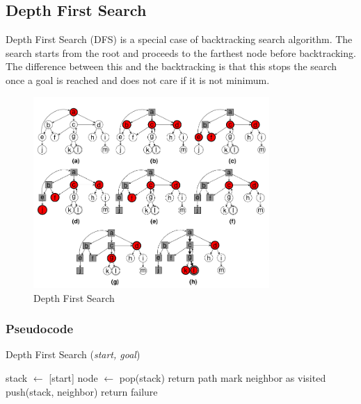 \subsection{Depth First Search}
\noindent Depth First Search (DFS) is a special case of backtracking search algorithm. The search starts from the root and proceeds to the farthest node before backtracking. The difference between this and the backtracking is that this stops the search once a goal is reached and does not care if it is not minimum.

\begin{figure}[H]
	\centering
	\includegraphics[width=0.8\textwidth]{./imgs/dfs.png}
	\caption{Depth First Search}
\end{figure}

\subsubsection{Pseudocode}
\begin{algorithm}[H]
	\caption{Depth First Search (\textit{start, goal})}\label{alg:dfs}
	\begin{algorithmic}[1]
	\State stack \(\gets\) [start]
		\State node \(\gets\) pop(stack)
			\State return path
		\EndIf
				\State mark neighbor as visited
				\State push(stack, neighbor)
			\EndIf
		\EndFor
	\EndWhile
	\State return failure
	\end{algorithmic}
\end{algorithm}

